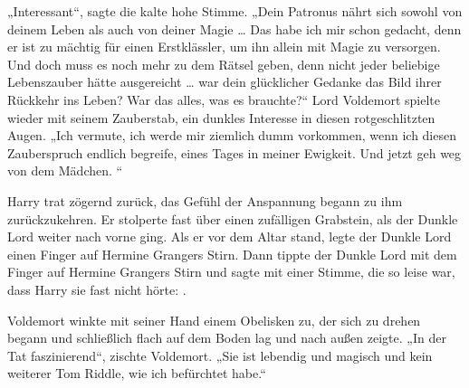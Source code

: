 „Interessant“, sagte die kalte hohe Stimme.
„Dein Patronus nährt sich sowohl von deinem Leben als auch von deiner Magie … Das habe ich mir schon gedacht, denn er ist zu mächtig für einen Erstklässler, um ihn allein mit Magie zu versorgen. Und doch muss es noch mehr zu dem Rätsel geben, denn nicht jeder beliebige Lebenszauber hätte ausgereicht … war dein glücklicher Gedanke das Bild ihrer Rückkehr ins Leben? War das alles, was es brauchte?“
Lord Voldemort spielte wieder mit seinem Zauberstab, ein dunkles Interesse in diesen rotgeschlitzten Augen.
„Ich vermute, ich werde mir ziemlich dumm vorkommen, wenn ich diesen Zauberspruch endlich begreife, eines Tages in meiner Ewigkeit. Und jetzt geh weg von dem Mädchen. “

Harry trat zögernd zurück, das Gefühl der Anspannung begann zu ihm zurückzukehren. Er stolperte fast über einen zufälligen Grabstein, als der Dunkle Lord weiter nach vorne ging.
Als er vor dem Altar stand, legte der Dunkle Lord einen Finger auf Hermine Grangers Stirn.
Dann tippte der Dunkle Lord mit dem Finger auf Hermine Grangers Stirn und sagte mit einer Stimme, die so leise war, dass Harry sie fast nicht hörte: .

Voldemort winkte mit seiner Hand einem Obelisken zu, der sich zu drehen begann und schließlich flach auf dem Boden lag und nach außen zeigte.
„In der Tat faszinierend“, zischte Voldemort.
„Sie ist lebendig und magisch und kein weiterer Tom Riddle, wie ich befürchtet habe.“

